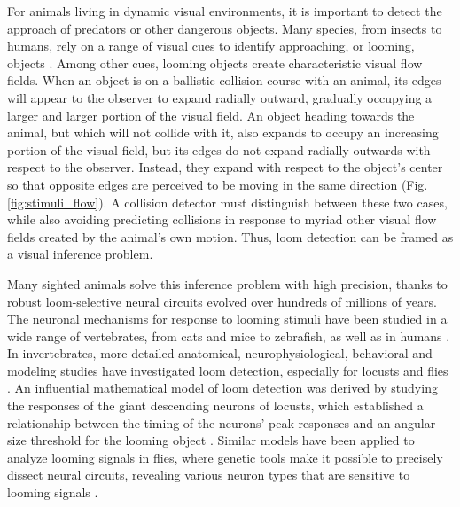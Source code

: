 \documentclass[pdftex,9pt,lineno]{elife}
\begin{document}
For animals living in dynamic visual environments, it is important to detect the approach of predators or other dangerous objects. Many species, from insects to humans, rely on a range of visual cues to identify approaching, or looming, objects \citep{regan1978looming,sun1998computation,gabbiani1999computation,card2008visually,munch2009approach,temizer2015visual}. Among other cues, looming objects create characteristic visual flow fields. When an object is on a ballistic collision course with an animal, its edges will appear to the observer to expand radially outward, gradually occupying a larger and larger portion of the visual field. An object heading towards the animal, but which will not collide with it, also expands to occupy an increasing portion of the visual field, but its edges do not expand radially outwards with respect to the observer. Instead, they expand with respect to the object's center so that opposite edges are perceived to be moving in the same direction (Fig. \ref{fig:stimuli_flow}). A collision detector must distinguish between these two cases, while also avoiding predicting collisions in response to myriad other visual flow fields created by the animal's own motion. Thus, loom detection can be framed as a visual inference problem.

Many sighted animals solve this inference problem with high precision, thanks to robust loom-selective neural circuits evolved over hundreds of millions of years. The neuronal mechanisms for response to looming stimuli have been studied in a wide range of vertebrates, from cats and mice to zebrafish, as well as in humans
\citep{king1992use,hervais2015looming,ball1971infant,liu2011neuronal,salay2018midline,liu2011neuronal,shang2015parvalbumin,wu2005tectal,temizer2015visual,dunn2016neural,bhattacharyya2017visual}.
In invertebrates, more detailed anatomical, neurophysiological, behavioral and modeling studies have investigated loom detection, especially for locusts and flies \citep{oliva2014computation,sato2014role,santer2005gliding,rind1996neural,card2008visually,de2012loom,muijres2014flies,klapoetke2017ultra,von2017feature,ache2019neural}.
An influential mathematical model of loom detection was derived by studying the responses of the giant descending neurons of locusts, which established a relationship between the timing of the neurons' peak responses and an angular size threshold for the looming object \citep{gabbiani1999computation}. Similar models have been applied to analyze looming signals in  flies, where  genetic tools make it possible to precisely dissect neural circuits, revealing various neuron types that are sensitive to looming signals \citep{von2017feature,ache2019neural,morimoto2020spatial}.
\end{document}
